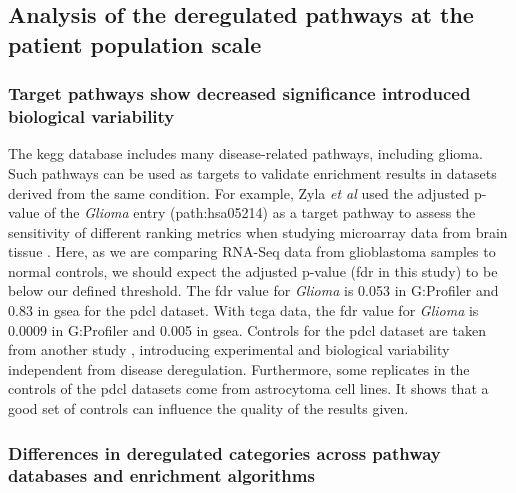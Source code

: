\subsection{Analysis of the deregulated pathways at the patient population scale}

\subsubsection{Target pathways show decreased significance introduced biological variability}

The \acrshort{kegg} database includes many disease-related pathways, including glioma.
Such pathways can be used as targets to validate enrichment results in datasets derived from the same condition.
For example, Zyla \textit{et al} used the adjusted p-value of the \textit{Glioma} entry (path:hsa05214) as a target pathway to assess the sensitivity of different ranking metrics when studying microarray data from brain tissue \cite*{Zyla2017}.
Here, as we are comparing RNA-Seq data from glioblastoma samples to normal controls, we should expect the adjusted p-value (\acrshort{fdr} in this study) to be below our defined threshold.
The \acrshort{fdr} value for \textit{Glioma} is 0.053 in G:Profiler and 0.83 in \acrshort{gsea} for the \acrshort{pdcl} dataset.
With \acrshort{tcga} data, the \acrshort{fdr} value for \textit{Glioma} is 0.0009 in G:Profiler and 0.005 in \acrshort{gsea}.
Controls for the \acrshort{pdcl} dataset are taken from another study \cite*{Lundin2018}, introducing experimental and biological variability independent from disease deregulation.
Furthermore, some replicates in the controls of the \acrshort{pdcl} datasets come from astrocytoma cell lines.
It shows that a good set of controls can influence the quality of the results given.

\subsubsection{Differences in deregulated categories across pathway databases and enrichment algorithms}

